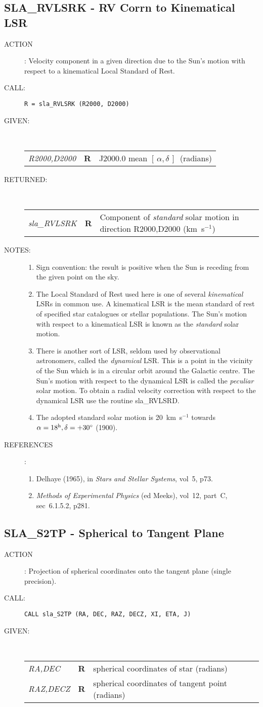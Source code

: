 \documentclass[11pt,twoside]{article}
\newcommand{\xlabel}[1]{}
\newcommand{\radec}     {$[\,\alpha,\delta\,]$}
\newcommand{\routine}[3]
{\hbadness=10000
  \vbox
  {
    \rule{\textwidth}{0.3mm}\\
    {\Large {\bf #1} \hfill #2 \hfill {\bf #1}}\\
    \setlength{\oldspacing}{\topsep}
    \setlength{\topsep}{0.3ex}
    \begin{description}
      #3
    \end{description}
    \setlength{\topsep}{\oldspacing}
  }
}
\renewcommand{\routine}[3]
   {
      \subsection{#1\xlabel{#1} - #2\label{#1}}
       \begin{description}
         #3
       \end{description}
   }
\newcommand{\action}[1]
{\item[ACTION]: #1}
\newcommand{\action}[1]
   {\item[ACTION:] #1}
\newcommand{\call}[1]
{\item[CALL]: \hspace{0.4em}{\tt #1}}
\newlength{\oldspacing}
\renewcommand{\call}[1]
   {
    \item[CALL:] {\tt #1}
   }
\newcommand{\args}[2]
{
  \goodbreak
  \setlength{\oldspacing}{\topsep}
  \setlength{\topsep}{0.3ex}
  \begin{description}
  \item[#1]:\\[1.5ex]
    \begin{tabular}{p{7em}p{6em}p{22em}}
      #2
    \end{tabular}
  \end{description}
  \setlength{\topsep}{\oldspacing}
}
\renewcommand{\args}[2]
   {
     \begin{description}
        \item[#1:]\\
        \begin{tabular}{p{7em}p{6em}l}
           #2
        \end{tabular}
     \end{description}
   }
\newcommand{\spec}[3]
{
  {\em {#1}} & {\bf \mbox{#2}} & {#3}
}
\newcommand{\notes}[1]
{
  \goodbreak
  \setlength{\oldspacing}{\topsep}
  \setlength{\topsep}{0.3ex}
  \begin{description}
    \item[NOTES]:
        #1
  \end{description}
  \setlength{\topsep}{\oldspacing}
}
\renewcommand{\notes}[1]
   {
      \begin{description}
         \item[NOTES:]
            #1
      \end{description}
   }
\newcommand{\refs}[1]
{
  \goodbreak
  \setlength{\oldspacing}{\topsep}
  \setlength{\topsep}{0.3ex}
  \begin{description}
    \item[REFERENCES]:
        #1
  \end{description}
  \setlength{\topsep}{\oldspacing}
}
\newcommand{\refs}[1]
   {
     \begin{description}
       \item[REFERENCES:]
           #1
     \end{description}
   }
\begin{document}
\routine{SLA\_RVLSRK}{RV Corrn to Kinematical LSR}
{
 \action{Velocity component in a given direction due to the Sun's
         motion with respect to a kinematical Local Standard of Rest.}
 \call{R~=~sla\_RVLSRK (R2000, D2000)}
}
\args{GIVEN}
{
 \spec{R2000,D2000}{R}{J2000.0 mean \radec\ (radians)}
}
\args{RETURNED}
{
 \spec{sla\_RVLSRK}{R}{Component of {\it standard}\/ solar motion
                      in direction R2000,D2000 (km~s$^{-1}$)}
}
\notes
{
 \begin{enumerate}
  \item Sign convention: the result is positive when
        the Sun is receding from the given point on the sky.
  \item The Local Standard of Rest used here is one of several
        {\it kinematical}\/ LSRs in common use.  A kinematical LSR is the
        mean standard of rest of specified star catalogues or stellar
        populations.  The Sun's motion with respect to a kinematical
        LSR is known as the {\it standard}\/ solar motion.
  \item There is another sort of LSR, seldom used by observational
        astronomers, called the {\it dynamical}\/ LSR.  This is a
        point in the vicinity of the Sun which is in a circular orbit
        around the Galactic centre.  The Sun's motion with respect to
        the dynamical LSR is called the {\it peculiar}\/ solar motion.  To
        obtain a radial velocity correction with respect to the
        dynamical LSR use the routine sla\_RVLSRD.
  \item The adopted standard solar motion is 20~km~s$^{-1}$
        towards $\alpha=18^{\rm h},\delta=+30^{\circ}$ (1900).
 \end{enumerate}
}
\refs
{
 \begin{enumerate}
  \item Delhaye (1965), in {\it Stars and Stellar Systems}, vol~5, p73.
  \item {\it Methods of Experimental Physics}\/ (ed Meeks), vol~12,
        part~C, sec~6.1.5.2, p281.
 \end{enumerate}
}
\routine{SLA\_S2TP}{Spherical to Tangent Plane}
{
 \action{Projection of spherical coordinates onto the tangent plane
         (single precision).}
 \call{CALL sla\_S2TP (RA, DEC, RAZ, DECZ, XI, ETA, J)}
}
\args{GIVEN}
{
 \spec{RA,DEC}{R}{spherical coordinates of star (radians)} \\
 \spec{RAZ,DECZ}{R}{spherical coordinates of tangent point (radians)}
}
\end{document}
